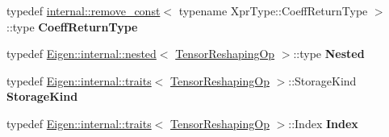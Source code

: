 \begin{DoxyCompactItemize}
\item 
\mbox{\label{class_eigen_1_1_tensor_reshaping_op_a1ae17c899e78f607ce2b780f74cda32a}} 
typedef \hyperlink{struct_eigen_1_1internal_1_1remove__const}{internal\+::remove\+\_\+const}$<$ typename Xpr\+Type\+::\+Coeff\+Return\+Type $>$\+::type {\bfseries Coeff\+Return\+Type}
\item 
\mbox{\label{class_eigen_1_1_tensor_reshaping_op_a1ef6ee8ea10f716b899e6a2258e3c540}} 
typedef \hyperlink{struct_eigen_1_1internal_1_1nested}{Eigen\+::internal\+::nested}$<$ \hyperlink{class_eigen_1_1_tensor_reshaping_op}{Tensor\+Reshaping\+Op} $>$\+::type {\bfseries Nested}
\item 
\mbox{\label{class_eigen_1_1_tensor_reshaping_op_a9ce6fb8ca1597a7a6b4a9603d644e9b2}} 
typedef \hyperlink{struct_eigen_1_1internal_1_1traits}{Eigen\+::internal\+::traits}$<$ \hyperlink{class_eigen_1_1_tensor_reshaping_op}{Tensor\+Reshaping\+Op} $>$\+::Storage\+Kind {\bfseries Storage\+Kind}
\item 
\mbox{\label{class_eigen_1_1_tensor_reshaping_op_ad81027a38850d26415401ef5dac63ecf}} 
typedef \hyperlink{struct_eigen_1_1internal_1_1traits}{Eigen\+::internal\+::traits}$<$ \hyperlink{class_eigen_1_1_tensor_reshaping_op}{Tensor\+Reshaping\+Op} $>$\+::Index {\bfseries Index}
\end{DoxyCompactItemize}
